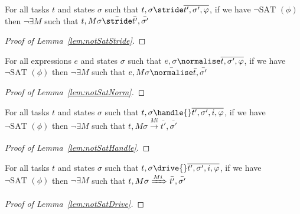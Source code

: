 \begin{lemma}
  \label{lem:notSatStride}
  For all tasks $t$ and states $\sigma$ such that $t,\sigma\stride\overline{t',\sigma',\phi}$, if we have $\neg\text{SAT }(\phi)$ then $\neg\exists M$ such that $t,M\sigma\bar{\stride}\bar{t'},\bar{\sigma'}$

\end{lemma}



\begin{proof}[Proof of Lemma~\ref{lem:notSatStride}]

\end{proof}

\begin{lemma}
  \label{lem:notSatNorm}
  For all expressions $e$ and states $\sigma$ such that $e,\sigma\normalise\overline{t,\sigma',\phi}$, if we have $\neg\text{SAT }(\phi)$ then $\neg\exists M$ such that $e,M\sigma\bar{\normalise}\bar{t},\bar{\sigma'}$

\end{lemma}



\begin{proof}[Proof of Lemma~\ref{lem:notSatNorm}]

\end{proof}

\begin{lemma}
  \label{lem:notSatHandle}
  For all tasks $t$ and states $\sigma$ such that $t,\sigma\handle{}\overline{t',\sigma',i,\phi}$, if we have $\neg\text{SAT }(\phi)$ then $\neg\exists M$ such that $t,M\sigma\xrightarrow[]{Mi}\bar{t'},\bar{\sigma'}$

\end{lemma}



\begin{proof}[Proof of Lemma~\ref{lem:notSatHandle}]

\end{proof}

\begin{lemma}
  \label{lem:notSatDrive}
  For all tasks $t$ and states $\sigma$ such that $t,\sigma\drive{}\overline{t',\sigma',i,\phi}$, if we have $\neg\text{SAT }(\phi)$ then $\neg\exists M$ such that $t,M\sigma\xRightarrow[]{Mi}\bar{t'},\bar{\sigma'}$

\end{lemma}

\begin{proof}[Proof of Lemma~\ref{lem:notSatDrive}]

\end{proof}
